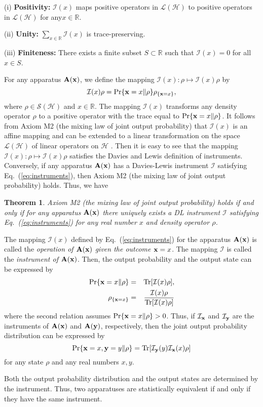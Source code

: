 \documentclass[12pt]{article}
\newcommand{\eeq}{\end{equation}}
\newcommand{\beql}[1]{\begin{equation}\label{eq:#1}}
\newcommand{\beqa}{\begin{eqnarray}}
\newcommand{\eeqa}{\end{eqnarray}}
\newcommand{\bA}{{\bf A}}
\newcommand{\cH}{{\mathcal H}}
\newcommand{\cI}{{\mathcal I}}
\newcommand{\cL}{{\mathcal L}}
\newcommand{\cS}{{\mathcal S}}
\newcommand{\rh}{\rho}
\newcommand{\tc}{\cL}
\newcommand{\Eq}[1]{Eq.~(\ref{eq:#1})}
\newcommand{\Tr}{\mbox{\rm Tr}}
\newcommand{\bx}{{\bf x}}
\newcommand{\by}{{\bf y}}
\newtheorem{Theorem}{Theorem}
\newcommand{\R}{\mathbb{R}}
\begin{document}
 (i) {\bf Positivity:}
$\cI(x)$ maps positive operators in $\tc(\cH)$ to positive operators
in $\tc(\cH)$ for any$x\in\R$.

 (ii) {\bf Unity:}  $\sum_{x\in\R}\cI(x)$ is trace-preserving.


 (iii) {\bf Finiteness: } There exists a finite subset $S\subset \R$
 such that $\cI(x)=0$ for all $x\in S$.
 
For any apparatus $\bA(\bx)$, 
we define the mapping $\cI(x):\rh\mapsto \cI(x)\rh$
by 
\beql{instruments}
\cI(x)\rh=\Pr\{\bx=x\|\rh\}\rh_{\{\bx=x\}},
\eeq
where $\rh\in\cS(\cH)$ and $x\in\R$.
The mapping $\cI(x)$  transforms any density operator $\rh$ to
a positive operator with the trace
equal to $\Pr\{\bx=x\|\rh\}$.
It follows from Axiom M2 (the mixing law of joint output probability) that $\cI(x)$
is an affine mapping and can be extended to a linear 
transformation on the space $\tc(\cH)$ of linear operators 
on $\cH$ \cite{97OQ,00MN}.
Then it is easy to see that the mapping $\cI(x):\rh\mapsto \cI(x)\rh$ satisfies the
Davies and Lewis definition of instruments.
Conversely, if any apparatus $\bA(\bx)$ has a Davies-Lewis instrument $\cI$ 
satisfying \Eq{instruments}, then Axiom M2 (the mixing law of joint output probability)
holds. 
Thus, we have \cite{00MN} 

\begin{Theorem}
\label{th:instrument}
Axiom M2 (the mixing law of joint output probability) holds if and only if 
for any apparatus $\bA(\bx)$ there uniquely exists 
a DL instrument $\cI$ satisfying \Eq{instruments}
for any real number $x$ and  density operator $\rh$.
\end{Theorem}

The mapping  $\cI(x)$ defined by \Eq{instruments} for  the apparatus $\bA(\bx)$ 
is called 
the {\em operation of $\bA(\bx)$ given the outcome  $\bx=x$}. The mapping $\cI$
is called the {\em instrument of $\bA(\bx)$}.
Then, the output probability and the output state can be
expressed by
\beqa
\Pr\{\bx=x\|\rh\}&=&\Tr[\cI(x)\rh],
\label{eq:DL1}\\
\rh_{\{\bx=x\}}&=&\frac{\cI(x)\rh}{\Tr[\cI(x)\rh]}
\label{eq:DL2}
\eeqa
where the second relation assumes $\Pr\{\bx=x\|\rh\}>0$.
Thus, if $\cI_{\bx}$ and $\cI_{\by}$ are the instruments
of $\bA(\bx)$ and $\bA(\by)$, respectively, 
then the joint output probability distribution can be expressed by
\beql{JOPD1}
\Pr\{\bx=x,\by=y\|\rh\}
=\Tr[\cI_{\by}(y)\cI_{\bx}(x)\rh]
\eeq
for any state $\rh$ and any real numbers $x,y$.

Both the output probability distribution and the output states
are determined by the instrument.  Thus,
two apparatuses are statistically equivalent if and only if 
they have the same instrument.
\end{document}
